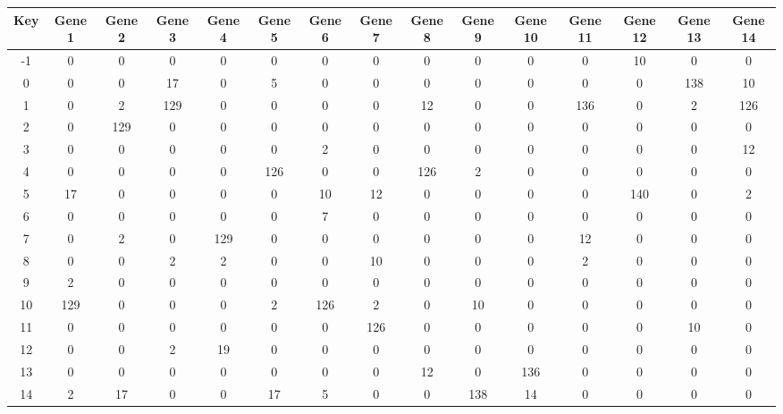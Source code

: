 \begin{tabular}{|c|c|c|c|c|c|c|c|c|c|c|c|c|c|c|}
\hline
Key & Gene 1 & Gene 2 & Gene 3 & Gene 4 & Gene 5 & Gene 6 & Gene 7 & Gene 8 & Gene 9 & Gene 10 & Gene 11 & Gene 12 & Gene 13 & Gene 14 \\
\hline
-1 & 0 & 0 & 0 & 0 & 0 & 0 & 0 & 0 & 0 & 0 & 0 & 10 & 0 & 0 \\
0 & 0 & 0 & 17 & 0 & 5 & 0 & 0 & 0 & 0 & 0 & 0 & 0 & 138 & 10 \\
1 & 0 & 2 & 129 & 0 & 0 & 0 & 0 & 12 & 0 & 0 & 136 & 0 & 2 & 126 \\
2 & 0 & 129 & 0 & 0 & 0 & 0 & 0 & 0 & 0 & 0 & 0 & 0 & 0 & 0 \\
3 & 0 & 0 & 0 & 0 & 0 & 2 & 0 & 0 & 0 & 0 & 0 & 0 & 0 & 12 \\
4 & 0 & 0 & 0 & 0 & 126 & 0 & 0 & 126 & 2 & 0 & 0 & 0 & 0 & 0 \\
5 & 17 & 0 & 0 & 0 & 0 & 10 & 12 & 0 & 0 & 0 & 0 & 140 & 0 & 2 \\
6 & 0 & 0 & 0 & 0 & 0 & 7 & 0 & 0 & 0 & 0 & 0 & 0 & 0 & 0 \\
7 & 0 & 2 & 0 & 129 & 0 & 0 & 0 & 0 & 0 & 0 & 12 & 0 & 0 & 0 \\
8 & 0 & 0 & 2 & 2 & 0 & 0 & 10 & 0 & 0 & 0 & 2 & 0 & 0 & 0 \\
9 & 2 & 0 & 0 & 0 & 0 & 0 & 0 & 0 & 0 & 0 & 0 & 0 & 0 & 0 \\
10 & 129 & 0 & 0 & 0 & 2 & 126 & 2 & 0 & 10 & 0 & 0 & 0 & 0 & 0 \\
11 & 0 & 0 & 0 & 0 & 0 & 0 & 126 & 0 & 0 & 0 & 0 & 0 & 10 & 0 \\
12 & 0 & 0 & 2 & 19 & 0 & 0 & 0 & 0 & 0 & 0 & 0 & 0 & 0 & 0 \\
13 & 0 & 0 & 0 & 0 & 0 & 0 & 0 & 12 & 0 & 136 & 0 & 0 & 0 & 0 \\
14 & 2 & 17 & 0 & 0 & 17 & 5 & 0 & 0 & 138 & 14 & 0 & 0 & 0 & 0 \\
\hline
\end{tabular}